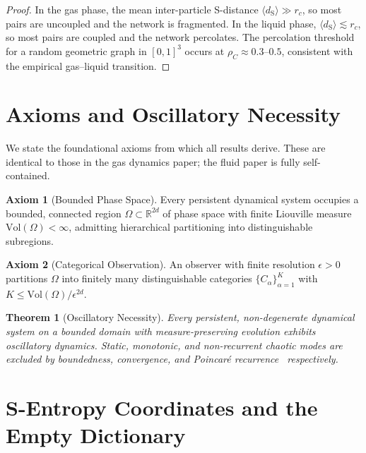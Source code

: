 \documentclass[twocolumn,10pt,a4paper]{article}
\theoremstyle{plain}
\newtheorem{theorem}{Theorem}[section]
\theoremstyle{definition}
\newtheorem{axiom}{Axiom}
\theoremstyle{remark}
\newcommand{\dS}{d_{\mathrm{S}}}
\begin{document}
\begin{proof}
In the gas phase, the mean inter-particle S-distance $\langle \dS \rangle \gg r_c$, so most pairs are uncoupled and the network is fragmented. In the liquid phase, $\langle \dS \rangle \lesssim r_c$, so most pairs are coupled and the network percolates. The percolation threshold for a random geometric graph in $[0,1]^3$ occurs at $\rho_C \approx 0.3$--$0.5$, consistent with the empirical gas--liquid transition.
\end{proof}

\section{Axioms and Oscillatory Necessity}
\label{sec:axioms}

We state the foundational axioms from which all results derive. These are identical to those in the gas dynamics paper; the fluid paper is fully self-contained.

\begin{axiom}[Bounded Phase Space]
\label{ax:bounded}
Every persistent dynamical system occupies a bounded, connected region $\Omega \subset \mathbb{R}^{2d}$ of phase space with finite Liouville measure $\mathrm{Vol}(\Omega) < \infty$, admitting hierarchical partitioning into distinguishable subregions.
\end{axiom}

\begin{axiom}[Categorical Observation]
\label{ax:categorical}
An observer with finite resolution $\epsilon > 0$ partitions $\Omega$ into finitely many distinguishable categories $\{C_\alpha\}_{\alpha=1}^{K}$ with $K \leq \mathrm{Vol}(\Omega)/\epsilon^{2d}$.
\end{axiom}

\begin{theorem}[Oscillatory Necessity]
\label{thm:oscillatory}
Every persistent, non-degenerate dynamical system on a bounded domain with measure-preserving evolution exhibits oscillatory dynamics. Static, monotonic, and non-recurrent chaotic modes are excluded by boundedness, convergence, and Poincar\'{e} recurrence~\cite{poincare1890} respectively.
\end{theorem}

\section{S-Entropy Coordinates and the Empty Dictionary}
\label{sec:s_coords}
\end{document}

